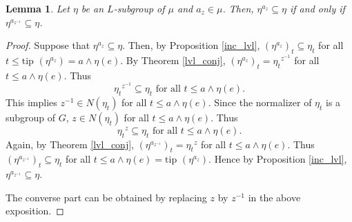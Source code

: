 \documentclass[10pt]{article}
\theoremstyle{plain}
\newtheorem{lemma}[theorem]{Lemma}
\theoremstyle{definition}
\theoremstyle{remark}
\theoremstyle{case}
\begin{document}
\begin{lemma}\label{lemma_con}
	Let $\eta$ be an $L$-subgroup of $\mu$ and $a_z \in \mu$. Then, $\eta^{a_z} \subseteq \eta$ if and only if $\eta^{a_{z^{-1}}} \subseteq \eta$. 
\end{lemma}
\begin{proof}
	 Suppose that $\eta^{a_z} \subseteq \eta$. Then, by Proposition \ref{inc_lvl}, $(\eta^{a_z})_t \subseteq \eta_t$ for all $t \leq \text{tip }(\eta^{a_z}) = a \wedge \eta(e)$. By Theorem \ref{lvl_conj}, $(\eta^{a_z})_t = {\eta_t}^{z^{-1}}$ for all $t \leq a \wedge \eta(e)$. Thus
	\[ {\eta_t}^{z^{-1}} \subseteq \eta_t \text{ for all } t \leq a \wedge \eta(e). \]
	This implies $z^{-1} \in N(\eta_t)$ for all $t \leq a \wedge \eta(e)$. Since the normalizer of $\eta_t$ is a subgroup of $G$, $z \in N(\eta_t)$ for all $t \leq a \wedge \eta(e)$. Thus
	\[ {\eta_t}^z \subseteq \eta_t \text{ for all } t \leq a \wedge \eta(e). \]
	Again, by Theorem \ref{lvl_conj}, $(\eta^{a_{z^{-1}}})_t = {\eta_t}^z$ for all $t \leq a \wedge \eta(e) $. Thus $(\eta^{a_{z^{-1}}})_t \subseteq \eta_t$ for all $t \leq a \wedge \eta(e)= \text{tip }(\eta^{a_z})$. Hence by Proposition \ref{inc_lvl}, $\eta^{a_{z^{-1}}} \subseteq \eta$.
	
	\noindent  The converse part can be obtained by replacing $z$ by $z^{-1}$ in the above exposition.	
\end{proof}
\end{document}
